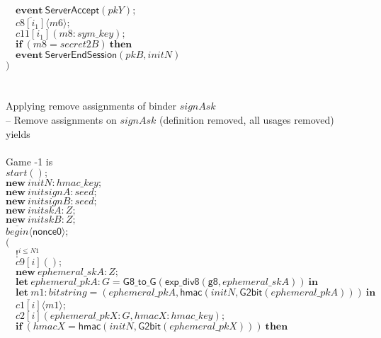 \documentclass{article}
\newcommand{\cinput}[2]{{#1}({#2})}
\newcommand{\coutput}[2]{\overline{#1}\langle{#2}\rangle}
\newcommand{\kw}[1]{\mathbf{#1}}
\newcommand{\kwf}[1]{\mathsf{#1}}
\newcommand{\var}[1]{\mathit{#1}}
\newcommand{\kwt}[1]{\mathit{#1}}
\newcommand{\kwp}[1]{\mathit{#1}}
\newcommand{\kwc}[1]{\mathit{#1}}
\begin{document}
\begin{tabbing}
\>$\quad \kw{event}\ \kwf{ServerAccept}(\var{pkY});$\\
\>$\quad \coutput{\kwc{c8}[\var{i}_{1}]}{\var{m6}};$\\
\>$\quad \cinput{\kwc{c11}[\var{i}_{1}]}{\var{m8}: \kwt{sym{\_}key}};$\\
\>$\quad \kw{if}\ (\var{m8}  =  \var{secret2B})\ \kw{then}$\\
\>$\quad \kw{event}\ \kwf{ServerEndSession}(\var{pkB}, \var{initN})$\\
\>$)$\\
\\
\\
Applying remove assignments of binder $\var{signAsk}$\\
\quad -- Remove assignments on $\var{signAsk}$ (definition removed, all usages removed)\\
yields\\
\\
Game -1 is\\
\>$\cinput{\kwc{start}}{};$\\
\>$\kw{new}\ \var{initN}: \kwt{hmac{\_}key};$\\
\>$\kw{new}\ \var{initsignA}: \kwt{seed};$\\
\>$\kw{new}\ \var{initsignB}: \kwt{seed};$\\
\>$\kw{new}\ \var{initskA}: \kwt{Z};$\\
\>$\kw{new}\ \var{initskB}: \kwt{Z};$\\
\>$\coutput{\kwc{begin}}{\kwf{nonce0}};$\\
\>$($\\
\>$\quad !^{\var{i} \leq \kwp{N1}}$\\
\>$\quad \cinput{\kwc{c9}[\var{i}]}{};$\\
\>$\quad \kw{new}\ \var{ephemeral{\_}skA}: \kwt{Z};$\\
\>$\quad \kw{let}\ \var{ephemeral{\_}pkA}: \kwt{G} = \kwf{G8{\_}to{\_}G}(\kwf{exp{\_}div8}(\kwf{g8}, \var{ephemeral{\_}skA}))\ \kw{in}$\\
\>$\quad \kw{let}\ \var{m1}: \kwt{bitstring} = \kwf{}(\var{ephemeral{\_}pkA}, \kwf{hmac}(\var{initN}, \kwf{G2bit}(\var{ephemeral{\_}pkA})))\ \kw{in}$\\
\>$\quad \coutput{\kwc{c1}[\var{i}]}{\var{m1}};$\\
\>$\quad \cinput{\kwc{c2}[\var{i}]}{\var{ephemeral{\_}pkX}: \kwt{G}, \var{hmacX}: \kwt{hmac{\_}key}};$\\
\>$\quad \kw{if}\ (\var{hmacX}  =  \kwf{hmac}(\var{initN}, \kwf{G2bit}(\var{ephemeral{\_}pkX})))\ \kw{then}$\\

\end{tabbing}
\end{document}
